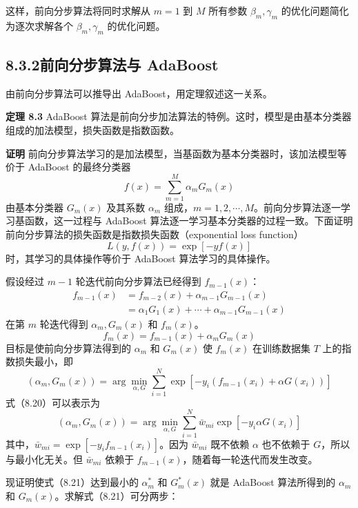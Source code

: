 \documentclass[UTF8, 12pt, fontset=fandol, oneside]{ctexart}
\begin{document}
这样，前向分步算法将同时求解从 $m=1$ 到 $M$ 所有参数 $\beta_m,\gamma_m$ 的优化问题简化为逐次求解各个 $\beta_m,\gamma_m$ 的优化问题。

\subsection*{8.3.2\quad 前向分步算法与 AdaBoost}

由前向分步算法可以推导出 AdaBoost，用定理叙述这一关系。

\noindent\textbf{定理 8.3}\quad
AdaBoost 算法是前向分步加法算法的特例。这时，模型是由基本分类器组成的加法模型，损失函数是指数函数。

\noindent\textbf{证明}\quad
前向分步算法学习的是加法模型，当基函数为基本分类器时，该加法模型等价于 AdaBoost 的最终分类器
\begin{equation}
f(x)=\sum_{m=1}^M\alpha_mG_m(x)
\tag{8.19}
\end{equation}
由基本分类器 $G_m(x)$ 及其系数 $\alpha_m$ 组成，$m=1,2,\cdots,M$。前向分步算法逐一学习基函数，这一过程与 AdaBoost 算法逐一学习基本分类器的过程一致。下面证明前向分步算法的损失函数是指数损失函数（exponential loss function）
\[
L(y,f(x))=\exp[-yf(x)]
\]
时，其学习的具体操作等价于 AdaBoost 算法学习的具体操作。

假设经过 $m-1$ 轮迭代前向分步算法已经得到 $f_{m-1}(x)$：
\[
\begin{aligned}
f_{m-1}(x)&=f_{m-2}(x)+\alpha_{m-1}G_{m-1}(x)\\
&=\alpha_1G_1(x)+\cdots+\alpha_{m-1}G_{m-1}(x)
\end{aligned}
\]
在第 $m$ 轮迭代得到 $\alpha_m,G_m(x)$ 和 $f_m(x)$。
\[
f_m(x)=f_{m-1}(x)+\alpha_mG_m(x)
\]
目标是使前向分步算法得到的 $\alpha_m$ 和 $G_m(x)$ 使 $f_m(x)$ 在训练数据集 $T$ 上的指数损失最小，即
\begin{equation}
(\alpha_m,G_m(x))=\arg\min_{\alpha,G}
\sum_{i=1}^N \exp[-y_i(f_{m-1}(x_i)+\alpha G(x_i))]
\tag{8.20}
\end{equation}
式（8.20）可以表示为
\begin{equation}
(\alpha_m,G_m(x))=\arg\min_{\alpha,G}
\sum_{i=1}^N \bar{w}_{mi}\exp[-y_i\alpha G(x_i)]
\tag{8.21}
\end{equation}
其中，$\bar{w}_{mi}=\exp[-y_if_{m-1}(x_i)]$。因为 $\bar{w}_{mi}$ 既不依赖 $\alpha$ 也不依赖于 $G$，所以与最小化无关。但 $\bar{w}_{mi}$ 依赖于 $f_{m-1}(x)$，随着每一轮迭代而发生改变。

现证明使式（8.21）达到最小的 $\alpha_m^\ast$ 和 $G_m^\ast(x)$ 就是 AdaBoost 算法所得到的 $\alpha_m$ 和 $G_m(x)$。求解式（8.21）可分两步：
\end{document}
